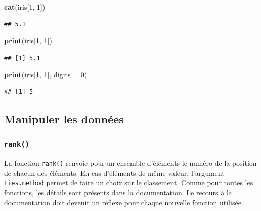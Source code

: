\documentclass[twoside,symmetric]{book}
\newenvironment{Shaded}{}{}
\newcommand{\DataTypeTok}[1]{\underline{#1}}
\newcommand{\DecValTok}[1]{#1}
\newcommand{\KeywordTok}[1]{\textbf{#1}}
\newcommand{\NormalTok}[1]{#1}
\begin{document}
\begin{Shaded}
\begin{Highlighting}[]
\KeywordTok{cat}\NormalTok{(iris[}\DecValTok{1}\NormalTok{, }\DecValTok{1}\NormalTok{])}
\end{Highlighting}
\end{Shaded}

\begin{verbatim}
## 5.1
\end{verbatim}

\begin{Shaded}
\begin{Highlighting}[]
\KeywordTok{print}\NormalTok{(iris[}\DecValTok{1}\NormalTok{, }\DecValTok{1}\NormalTok{])}
\end{Highlighting}
\end{Shaded}

\begin{verbatim}
## [1] 5.1
\end{verbatim}

\begin{Shaded}
\begin{Highlighting}[]
\KeywordTok{print}\NormalTok{(iris[}\DecValTok{1}\NormalTok{, }\DecValTok{1}\NormalTok{], }\DataTypeTok{digits =} \DecValTok{0}\NormalTok{)}
\end{Highlighting}
\end{Shaded}

\begin{verbatim}
## [1] 5
\end{verbatim}

\hypertarget{manipuler-les-donnuxe9es}{%
\subsection{Manipuler les données}\label{manipuler-les-donnuxe9es}}

\hypertarget{l015rank}{%
\subsubsection{\texorpdfstring{\texttt{rank()}}{rank()}}\label{l015rank}}

La fonction \texttt{rank()} renvoie pour un ensemble d'éléments le numéro de la position de chacun des éléments. En cas d'éléments de même valeur, l'argument \texttt{ties.method} permet de faire un choix sur le classement. Comme pour toutes les fonctions, les détails sont présents dans la documentation. Le recours à la documentation doit devenir un réflexe pour chaque nouvelle fonction utilisée.
\end{document}
